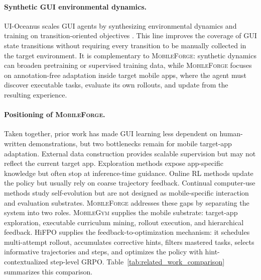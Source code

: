\documentclass{llmxive}
\providecommand{\ourmethod}{\textsc{MobileForge}\xspace}
\providecommand{\mobilegym}{\textsc{MobileGym}\xspace}
\providecommand{\hifpo}{HiFPO\xspace}
\begin{document}
\paragraph{Synthetic GUI environmental dynamics.}
UI-Oceanus scales GUI agents by synthesizing environmental dynamics and training on transition-oriented objectives \citep{wu2026uioceanus}. This line improves the coverage of GUI state transitions without requiring every transition to be manually collected in the target environment. It is complementary to \ourmethod: synthetic dynamics can broaden pretraining or supervised training data, while \ourmethod focuses on annotation-free adaptation inside target mobile apps, where the agent must discover executable tasks, evaluate its own rollouts, and update from the resulting experience.

\paragraph{Positioning of \ourmethod.}
Taken together, prior work has made GUI learning less dependent on human-written demonstrations, but two bottlenecks remain for mobile target-app adaptation. External data construction provides scalable supervision but may not reflect the current target app. Exploration methods expose app-specific knowledge but often stop at inference-time guidance. Online RL methods update the policy but usually rely on coarse trajectory feedback. Continual computer-use methods study self-evolution but are not designed as mobile-specific interaction and evaluation substrates. \ourmethod addresses these gaps by separating the system into two roles. \mobilegym supplies the mobile substrate: target-app exploration, executable curriculum mining, rollout execution, and hierarchical feedback. \hifpo supplies the feedback-to-optimization mechanism: it schedules multi-attempt rollout, accumulates corrective hints, filters mastered tasks, selects informative trajectories and steps, and optimizes the policy with hint-contextualized step-level GRPO. Table~\ref{tab:related_work_comparison} summarizes this comparison.
\end{document}
